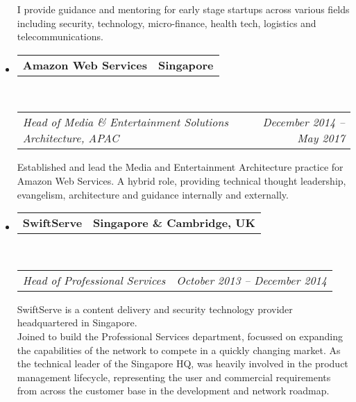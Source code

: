 \documentclass[10pt,a4paper]{article}
\makeatletter
\newcommand{\headerrow}[2]
{\begin{tabular*}{\linewidth}{l@{\extracolsep{\fill}}r}
    #1 &
    #2 \\
\end{tabular*}}
\makeatother
\begin{document}
\begin{itemize}
            I provide guidance and mentoring for early stage startups across various fields including security, technology, micro-finance, health tech, logistics and telecommunications.
    \item
        \headerrow
            {\textbf{Amazon Web Services}}
            {\textbf{Singapore}}
            \\
        \headerrow
            {\emph{Head of Media \& Entertainment Solutions Architecture, APAC}}
            {\emph{December 2014 -- May 2017}}
                
            Established and lead the Media and Entertainment Architecture practice for Amazon Web Services. A hybrid role, providing technical thought leadership, evangelism, architecture and guidance internally and externally.  
                

    \item
        \headerrow
            {\textbf{SwiftServe}}
            {\textbf{Singapore \& Cambridge, UK}}
        \\
        \headerrow
            {\emph{Head of Professional Services}}
            {\emph{October 2013 -- December 2014}}
    
            SwiftServe is a content delivery and security technology provider headquartered in Singapore.
            \\
            Joined to build the Professional Services department, focussed on expanding the capabilities of the network to compete in a quickly changing market. As the technical leader of the Singapore HQ, was heavily involved in the product management lifecycle, representing the user and commercial requirements from across the customer base in the development and network roadmap.
            

\end{itemize}
\end{document}
